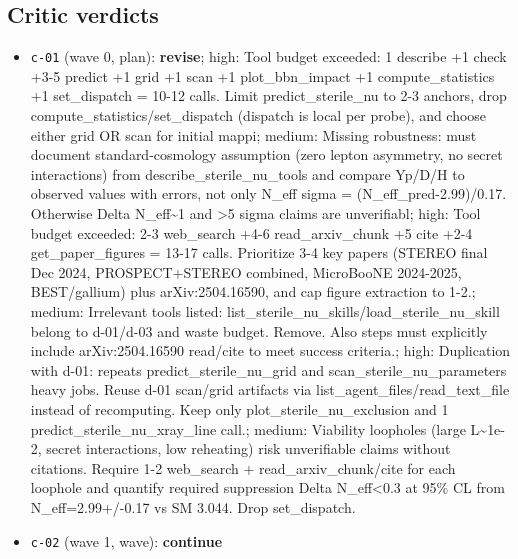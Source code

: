 \documentclass[11pt,a4paper]{article}
\begin{document}
\subsection{Critic verdicts}
\begin{itemize}
  \item \texttt{c-01} (wave 0, plan): \textbf{revise}; high: Tool budget exceeded: 1 describe +1 check +3-5 predict +1 grid +1 scan +1 plot\_bbn\_impact +1 compute\_statistics +1 set\_dispatch = 10-12 calls. Limit predict\_sterile\_nu to 2-3 anchors, drop compute\_statistics/set\_dispatch (dispatch is local per probe), and choose either grid OR scan for initial mappi; medium: Missing robustness: must document standard-cosmology assumption (zero lepton asymmetry, no secret interactions) from describe\_sterile\_nu\_tools and compare Yp/D/H to observed values with errors, not only N\_eff sigma = (N\_eff\_pred-2.99)/0.17. Otherwise Delta N\_eff\textasciitilde{}1 and \textgreater{}5 sigma claims are unverifiabl; high: Tool budget exceeded: 2-3 web\_search +4-6 read\_arxiv\_chunk +5 cite +2-4 get\_paper\_figures = 13-17 calls. Prioritize 3-4 key papers (STEREO final Dec 2024, PROSPECT+STEREO combined, MicroBooNE 2024-2025, BEST/gallium) plus arXiv:2504.16590, and cap figure extraction to 1-2.; medium: Irrelevant tools listed: list\_sterile\_nu\_skills/load\_sterile\_nu\_skill belong to d-01/d-03 and waste budget. Remove. Also steps must explicitly include arXiv:2504.16590 read/cite to meet success criteria.; high: Duplication with d-01: repeats predict\_sterile\_nu\_grid and scan\_sterile\_nu\_parameters heavy jobs. Reuse d-01 scan/grid artifacts via list\_agent\_files/read\_text\_file instead of recomputing. Keep only plot\_sterile\_nu\_exclusion and 1 predict\_sterile\_nu\_xray\_line call.; medium: Viability loopholes (large L\textasciitilde{}1e-2, secret interactions, low reheating) risk unverifiable claims without citations. Require 1-2 web\_search + read\_arxiv\_chunk/cite for each loophole and quantify required suppression Delta N\_eff\textless{}0.3 at 95\% CL from N\_eff=2.99+/-0.17 vs SM 3.044. Drop set\_dispatch.
  \item \texttt{c-02} (wave 1, wave): \textbf{continue}

\end{itemize}
\end{document}
